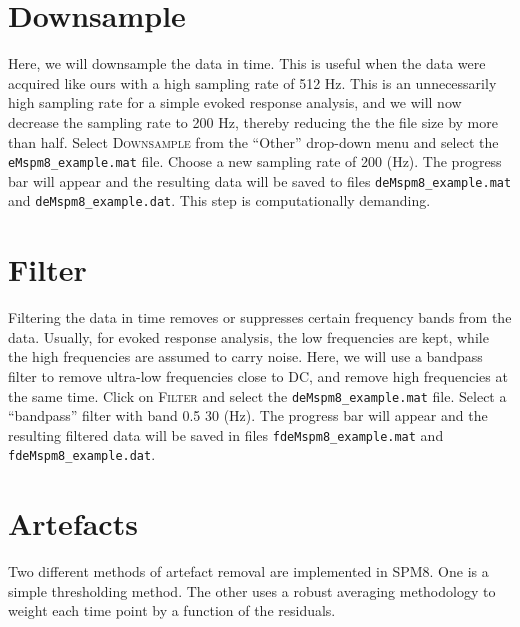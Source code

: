 \section{Downsample}
Here, we will downsample the data in time. This is useful when the data were acquired like ours with a high sampling rate of 512 Hz. This is an unnecessarily high sampling rate for a simple evoked response analysis, and we will now decrease the sampling rate to 200 Hz, thereby reducing the the file size by more than half. Select \textsc{Downsample} from the ``Other'' drop-down menu and select the \texttt{eMspm8\_example.mat} file. Choose a new sampling rate of 200 (Hz). The progress bar will appear and the resulting data will be saved to files \texttt{deMspm8\_example.mat} and \texttt{deMspm8\_example.dat}. This step is computationally demanding.

\section{Filter}
Filtering the data in time removes or suppresses certain frequency bands from the data. Usually, for evoked response analysis, the low frequencies are kept, while the high frequencies are assumed to carry noise. Here, we will use a bandpass filter to remove ultra-low frequencies close to DC, and remove high frequencies at the same time. Click on \textsc{Filter} and select the \texttt{deMspm8\_example.mat} file. Select a ``bandpass'' filter with band 0.5 30 (Hz). The progress bar will appear and the resulting filtered data will be saved in files \texttt{fdeMspm8\_example.mat} and \texttt{fdeMspm8\_example.dat}.

\section{Artefacts}
Two different methods of artefact removal are implemented in SPM8. One is a simple thresholding method. The other uses a robust averaging methodology to weight each time point by a function of the residuals.

